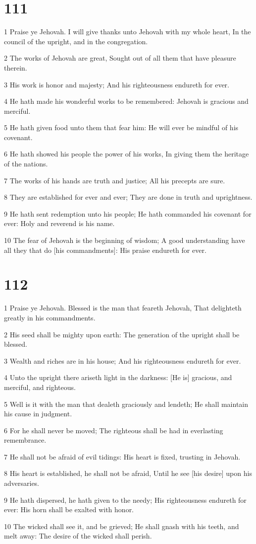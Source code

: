 \chapter{111}

\par 1 Praise ye Jehovah. I will give thanks unto Jehovah with my whole heart, In the council of the upright, and in the congregation.
\par 2 The works of Jehovah are great, Sought out of all them that have pleasure therein.
\par 3 His work is honor and majesty; And his righteousness endureth for ever.
\par 4 He hath made his wonderful works to be remembered: Jehovah is gracious and merciful.
\par 5 He hath given food unto them that fear him: He will ever be mindful of his covenant.
\par 6 He hath showed his people the power of his works, In giving them the heritage of the nations.
\par 7 The works of his hands are truth and justice; All his precepts are sure.
\par 8 They are established for ever and ever; They are done in truth and uprightness.
\par 9 He hath sent redemption unto his people; He hath commanded his covenant for ever: Holy and reverend is his name.
\par 10 The fear of Jehovah is the beginning of wisdom; A good understanding have all they that do [his commandments]: His praise endureth for ever.

\chapter{112}

\par 1 Praise ye Jehovah. Blessed is the man that feareth Jehovah, That delighteth greatly in his commandments.
\par 2 His seed shall be mighty upon earth: The generation of the upright shall be blessed.
\par 3 Wealth and riches are in his house; And his righteousness endureth for ever.
\par 4 Unto the upright there ariseth light in the darkness: [He is] gracious, and merciful, and righteous.
\par 5 Well is it with the man that dealeth graciously and lendeth; He shall maintain his cause in judgment.
\par 6 For he shall never be moved; The righteous shall be had in everlasting remembrance.
\par 7 He shall not be afraid of evil tidings: His heart is fixed, trusting in Jehovah.
\par 8 His heart is established, he shall not be afraid, Until he see [his desire] upon his adversaries.
\par 9 He hath dispersed, he hath given to the needy; His righteousness endureth for ever: His horn shall be exalted with honor.
\par 10 The wicked shall see it, and be grieved; He shall gnash with his teeth, and melt away: The desire of the wicked shall perish.

